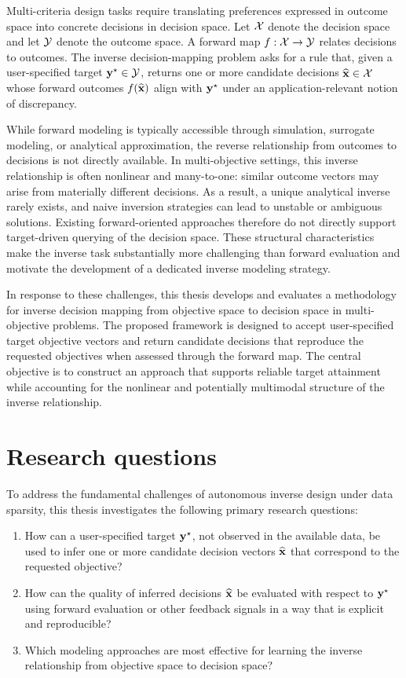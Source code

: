 Multi-criteria design tasks require translating preferences expressed in outcome space into concrete decisions in decision space. Let $\mathcal{X}$ denote the decision space and let $\mathcal{Y}$ denote the outcome space. A forward map $f:\mathcal{X}\to\mathcal{Y}$ relates decisions to outcomes. The inverse decision-mapping problem asks for a rule that, given a user-specified target $\mathbf{y}^{\star}\in\mathcal{Y}$, returns one or more candidate decisions $\widehat{\mathbf{x}}\in\mathcal{X}$ whose forward outcomes $f(\widehat{\mathbf{x}})$ align with $\mathbf{y}^{\star}$ under an application-relevant notion of discrepancy.

While forward modeling is typically accessible through simulation, surrogate modeling, or analytical approximation, the reverse relationship from outcomes to decisions is not directly available. In multi-objective settings, this inverse relationship is often nonlinear and many-to-one: similar outcome vectors may arise from materially different decisions. As a result, a unique analytical inverse rarely exists, and naive inversion strategies can lead to unstable or ambiguous solutions. Existing forward-oriented approaches therefore do not directly support target-driven querying of the decision space. These structural characteristics make the inverse task substantially more challenging than forward evaluation and motivate the development of a dedicated inverse modeling strategy.

In response to these challenges, this thesis develops and evaluates a methodology for inverse decision mapping from objective space to decision space in multi-objective problems. The proposed framework is designed to accept user-specified target objective vectors and return candidate decisions that reproduce the requested objectives when assessed through the forward map. The central objective is to construct an approach that supports reliable target attainment while accounting for the nonlinear and potentially multimodal structure of the inverse relationship.



\section{Research questions}
To address the fundamental challenges of autonomous inverse design under data sparsity, this thesis investigates the following primary research questions:

\begin{enumerate}
  \item How can a user-specified target $\mathbf{y}^{\star}$, not observed in the available data, be used to infer one or more candidate decision vectors $\widehat{\mathbf{x}}$ that correspond to the requested objective?
  \item How can the quality of inferred decisions $\widehat{\mathbf{x}}$ be evaluated with respect to $\mathbf{y}^{\star}$ using forward evaluation or other feedback signals in a way that is explicit and reproducible?
  \item Which modeling approaches are most effective for learning the inverse relationship from objective space to decision space?
\end{enumerate}


